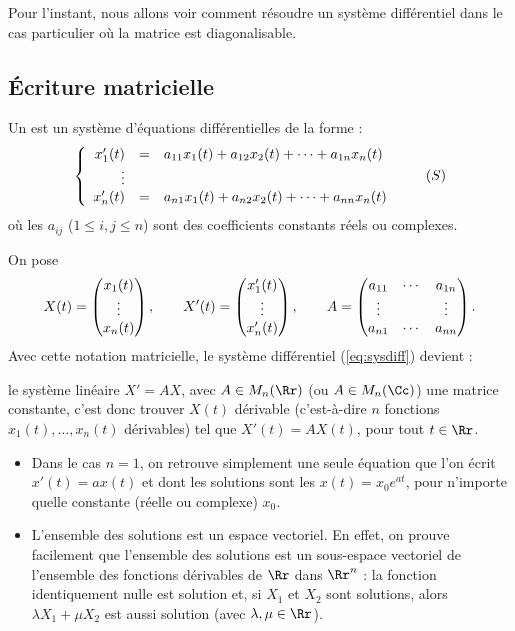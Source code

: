 \documentclass[12pt, class=report,crop=false]{standalone}
\begin{document}
Pour l'instant, nous allons voir comment résoudre un système différentiel dans le cas particulier où la matrice est diagonalisable.
 

\subsection{\'Ecriture matricielle}


Un  est un système d'équations différentielles de la forme :
\begin{equation}
\left\{\begin{array}{rcl}
x'_1(t)&=& a_{11}x_1(t)+a_{12}x_2(t)+\cdots+a_{1n}x_n(t)\cr
\vdots&& \cr 
x'_n(t) &=& a_{n1}x_1(t)+a_{n2}x_2(t)+\cdots+a_{nn}x_n(t)
\end{array}\right.
\label{eq:sysdiff}\tag{$S$}
\end{equation}
où les $a_{ij}$ ($1\le i,j \le n$) sont des coefficients constants réels ou complexes. 

On pose 
$$X(t) = \begin{pmatrix}x_1(t)\cr \vdots \cr x_n(t)\end{pmatrix},\qquad
X'(t) = \begin{pmatrix}x_1'(t)\cr \vdots \cr x_n'(t)\end{pmatrix},\qquad
A = \begin{pmatrix}
a_{11} & \cdots & a_{1n} \cr
\vdots &       & \vdots \cr
a_{n1} & \cdots & a_{nn} \cr
\end{pmatrix}.$$
Avec cette notation matricielle, le système différentiel (\ref{eq:sysdiff}) devient :


 le système linéaire $X'=AX$, avec $A \in M_n(\Rr)$ (ou $A \in M_n(\Cc)$) une matrice constante, c'est donc trouver $X(t)$ dérivable (c'est-à-dire $n$ fonctions $x_1(t),\ldots,x_n(t)$ dérivables) tel que $X'(t) = A X(t)$, pour tout $t \in \Rr$.


\begin{remarque*}
\sauteligne
\begin{itemize}
  \item Dans le cas $n=1$, on retrouve simplement une seule équation que l'on écrit $x'(t) = a x(t)$ et dont les solutions sont les $x(t) = x_0 e^{at}$, pour n'importe quelle constante (réelle ou complexe) $x_0$.
  \item L'ensemble des solutions est un espace vectoriel. En effet, on prouve facilement que l'ensemble des solutions est un sous-espace vectoriel de l'ensemble des fonctions dérivables de $\Rr$ dans $\Rr^n$ : la fonction identiquement nulle est solution et, si $X_1$ et $X_2$ sont solutions, alors $\lambda X_1+\mu X_2$ est aussi solution (avec $\lambda,\mu \in \Rr$).
\end{itemize}
\end{remarque*}
\end{document}
